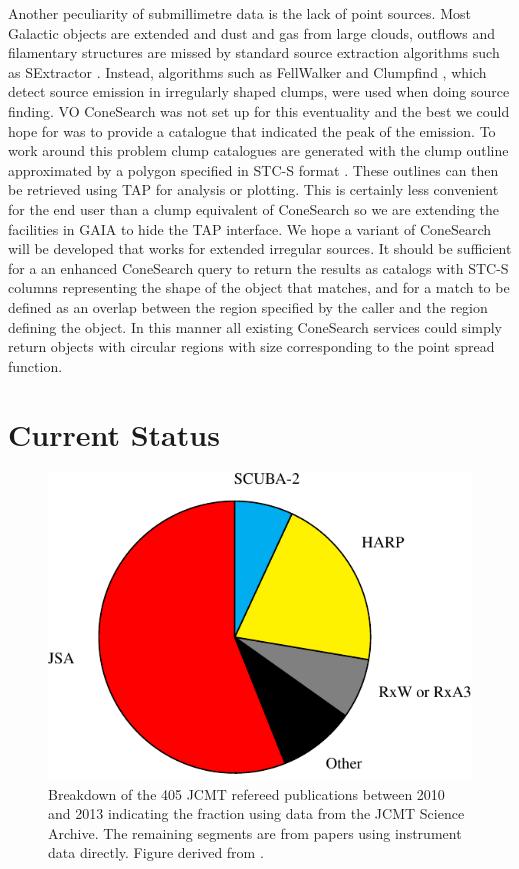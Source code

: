 \documentclass[final,authoryear,5p,times,twocolumn]{elsarticle}
\begin{document}
Another peculiarity of submillimetre data is the lack of point
sources. Most Galactic objects are extended and dust and gas from
large clouds, outflows and filamentary structures are missed by
standard source extraction algorithms such as SExtractor
\citep[][]{1996A&AS..117..393B}. Instead, algorithms
such as FellWalker \citep[][]{2015FW,2007ASPC..376..425B} and
Clumpfind \citep[][]{1994ApJ...428..693W}, which detect
source emission in irregularly shaped clumps, were used when
doing source finding. VO ConeSearch was not
set up for this eventuality and the best we could hope for was to
provide a catalogue that indicated the peak of the emission. To work
around this problem clump catalogues are generated with the clump
outline approximated by a polygon specified in STC-S format
\citep{2010ASPC..434..213B}. These outlines can then be retrieved
using TAP for analysis or plotting. This is certainly less convenient
for the end user than a clump equivalent of ConeSearch so we are
extending the facilities in GAIA
\citep[][]{2009ASPC..411..575D} to hide the TAP
interface. We hope a variant of ConeSearch will be developed that
works for extended irregular sources.
It should be sufficient for a an enhanced ConeSearch query to return
the results as catalogs with STC-S columns representing the shape of
the object that matches, and for a match to be defined as an overlap
between the region specified by the caller and the region defining the
object. In this manner all existing ConeSearch services could simply
return objects with circular regions with size corresponding to the
point spread function.

\section{Current Status}

\begin{figure}[t]
\includegraphics[width=\columnwidth]{jcmt-pubs-crop}
\caption{Breakdown of the 405 JCMT refereed publications between 2010 and
    2013 indicating the fraction using data from the JCMT Science
    Archive. The remaining segments are from papers using instrument
    data directly. Figure derived from \citet{2014SPIE9152-93}.}
\label{fig:jsapubs}
\end{figure}
\end{document}
